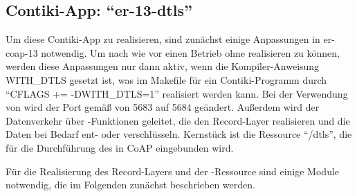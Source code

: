 \subsection{Contiki-App: "`er-13-dtls"'}

Um diese Contiki-App zu realisieren, sind zunächst einige Anpassungen in er-coap-13 notwendig. Um nach wie vor einen Betrieb ohne  realisieren zu können,
werden diese Anpassungen nur dann aktiv, wenn die Kompiler-Anweisung WITH\_DTLS gesetzt ist, was im Makefile für ein Contiki-Programm durch "`CFLAGS += -DWITH\_DTLS=1"'
realisiert werden kann. Bei der Verwendung von  wird der Port gemäß \cite[Seite 93]{portnumbers} von 5683 auf 5684 geändert. Außerdem wird der Datenverkehr
über -Funktionen geleitet, die den Record-Layer realisieren und die Daten bei Bedarf ent- oder verschlüsseln. Kernstück ist die Ressource "`/dtls"', die für
die Durchführung des  in CoAP eingebunden wird.

Für die Realisierung des Record-Layers und der -Ressource sind einige Module notwendig, die im Folgenden zunächst beschrieben werden.

